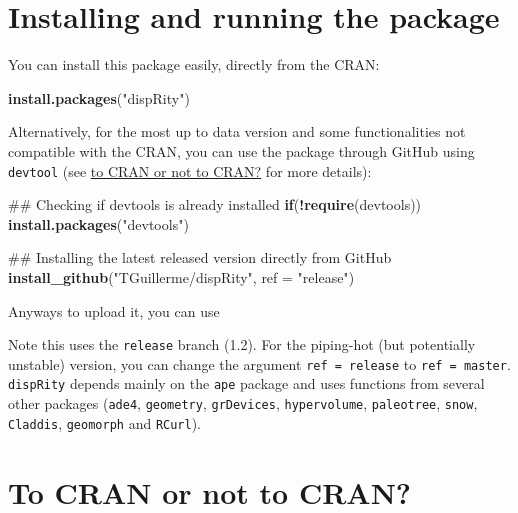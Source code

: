 \documentclass[]{book}
\newenvironment{Shaded}{\begin{snugshade}}{\end{snugshade}}
\newcommand{\KeywordTok}[1]{\textcolor[rgb]{0.13,0.29,0.53}{\textbf{#1}}}
\newcommand{\DataTypeTok}[1]{\textcolor[rgb]{0.13,0.29,0.53}{#1}}
\newcommand{\StringTok}[1]{\textcolor[rgb]{0.31,0.60,0.02}{#1}}
\newcommand{\ControlFlowTok}[1]{\textcolor[rgb]{0.13,0.29,0.53}{\textbf{#1}}}
\newcommand{\OperatorTok}[1]{\textcolor[rgb]{0.81,0.36,0.00}{\textbf{#1}}}
\newcommand{\NormalTok}[1]{#1}
\theoremstyle{definition}
\theoremstyle{definition}
\theoremstyle{definition}
\theoremstyle{remark}
\begin{document}
\section{Installing and running the
package}\label{installing-and-running-the-package}

You can install this package easily, directly from the CRAN:

\begin{Shaded}
\begin{Highlighting}[]
\KeywordTok{install.packages}\NormalTok{(}\StringTok{"dispRity"}\NormalTok{)}
\end{Highlighting}
\end{Shaded}

Alternatively, for the most up to data version and some functionalities
not compatible with the CRAN, you can use the package through GitHub
using \texttt{devtool} (see \protect\hyperlink{noCRAN}{to CRAN or not to
CRAN?} for more details):

\begin{Shaded}
\begin{Highlighting}[]
\NormalTok{## Checking if devtools is already installed}
\ControlFlowTok{if}\NormalTok{(}\OperatorTok{!}\KeywordTok{require}\NormalTok{(devtools)) }\KeywordTok{install.packages}\NormalTok{(}\StringTok{"devtools"}\NormalTok{)}

\NormalTok{## Installing the latest released version directly from GitHub}
\KeywordTok{install_github}\NormalTok{(}\StringTok{"TGuillerme/dispRity"}\NormalTok{, }\DataTypeTok{ref =} \StringTok{"release"}\NormalTok{)}
\end{Highlighting}
\end{Shaded}

Anyways to upload it, you can use

Note this uses the \texttt{release} branch (1.2). For the piping-hot
(but potentially unstable) version, you can change the argument
\texttt{ref\ =\ release} to \texttt{ref\ =\ master}. \texttt{dispRity}
depends mainly on the \texttt{ape} package and uses functions from
several other packages (\texttt{ade4}, \texttt{geometry},
\texttt{grDevices}, \texttt{hypervolume}, \texttt{paleotree},
\texttt{snow}, \texttt{Claddis}, \texttt{geomorph} and \texttt{RCurl}).

\hypertarget{noCRAN}{\section{To CRAN or not to CRAN?}\label{noCRAN}}
\end{document}
